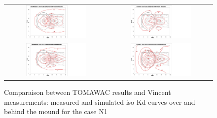 \begin{figure}[H]
  \centering
\begin{tabular}{cc}
    \includegraphics[width=0.62\textwidth]{iso-Kd_nodiff_dx035.jpg}& \hspace{-3cm}
    \includegraphics[width=0.62\textwidth]{iso-Kd_cr004-dx035.jpg}\\
    \includegraphics[width=0.62\textwidth]{iso-Kd_nodiff_dx018.jpg}& \hspace{-3cm}
    \includegraphics[width=0.62\textwidth]{iso-Kd_cr0015_dx018.jpg}\\
\end{tabular}
\caption{Comparaison between TOMAWAC results and Vincent measurements: measured and simulated iso-Kd curves over and behind the mound for the case N1}
\label {comparisonN1}
\end{figure}


